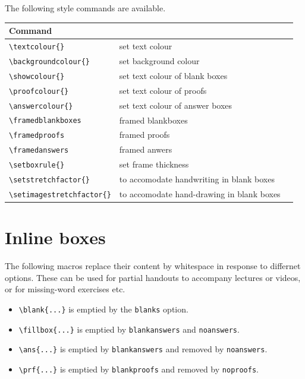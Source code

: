 \documentclass{article}
\theoremstyle{definition}
\begin{document}
The following style commands are available.
\begin{table}[htb]
\renewcommand{\arraystretch}{1.3}
\addtolength{\tabcolsep}{2ex}
\begin{tabular}{lll}
\hline\hline
Command							& \hspace{0.3\textwidth}\mbox{}\\
\hline
\verb+\textcolour{}+			&  set text colour\\
\verb+\backgroundcolour{}+		&  set background colour \\
\verb+\showcolour{}+			&  set text colour of blank boxes\\
\verb+\proofcolour{}+			&  set text colour of proofs \\
\verb+\answercolour{}+			&  set text colour of answer boxes \\
\hline
\verb+\framedblankboxes+		&  framed blankboxes \\
\verb+\framedproofs+			&  framed proofs\\
\verb+\framedanswers+			&  framed anwers\\
\verb+\setboxrule{}+			&  set frame thickness\\
\hline
\verb+\setstretchfactor{}+		&  to accomodate handwriting in blank boxes\\
\verb+\setimagestretchfactor{}+	&  to accomodate hand-drawing in blank boxes\\
\hline\hline
\end{tabular}
\end{table}

\section{Inline boxes}
The following macros replace their content by whitespace in response to differnet options. These can be used for partial handouts to accompany lectures or videos, or for missing-word exercises etc.
\begin{itemize}
\item \verb+\blank{...}+ is emptied by the {\tt blanks} option.
\item \verb+\fillbox{...}+ is emptied by {\tt blankanswers} and {\tt noanswers}.
\item \verb+\ans{...}+ is emptied by {\tt blankanswers} and removed by {\tt noanswers}.
\item \verb+\prf{...}+ is emptied by {\tt blankproofs} and removed by {\tt noproofs}.
\end{itemize}
\end{document}
